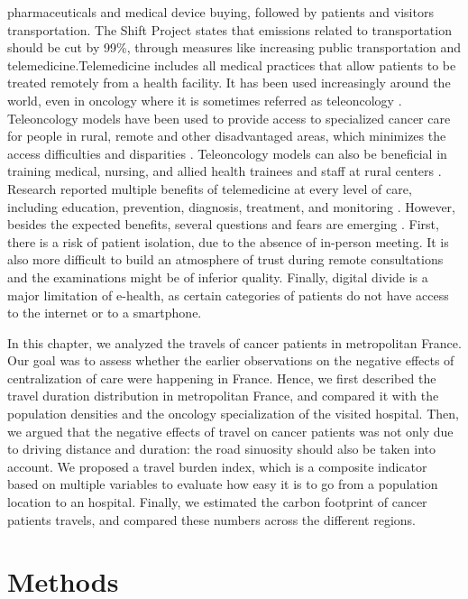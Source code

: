 pharmaceuticals and medical device buying, followed by patients and visitors
transportation. The Shift Project states that emissions related to
transportation should be cut by 99\%, through measures like increasing public
transportation and telemedicine.Telemedicine includes all medical practices that
allow patients to be treated remotely from a health facility. It has been used
increasingly around the world, even in oncology where it is sometimes referred
as teleoncology
\cite{mooi_teleoncology_2012,sabesan_are_2014,sabesan_timely_2014,sabesan_medical_2014}.
Teleoncology models have been used to provide access to specialized cancer care
for people in rural, remote and other disadvantaged areas, which minimizes the
access difficulties and disparities \cite{sabesan_telemedicine_2012,
    sabesan_are_2014}. Teleoncology models can also be beneficial in training
medical, nursing, and allied health trainees and staff at rural centers
\cite{sabesan_medical_2014}. Research reported multiple benefits of telemedicine
at every level of care, including education, prevention, diagnosis, treatment,
and monitoring \cite{bertucci_outpatient_2019}. However, besides the expected
benefits, several questions and fears are emerging
\cite{bertucci_outpatient_2019}. First, there is a risk of patient isolation,
due to the absence of in-person meeting. It is also more difficult to build an
atmosphere of trust during remote consultations and the examinations might be of
inferior quality. Finally, digital divide is a major limitation of e-health, as
certain categories of patients do not have access to the internet or to a
smartphone.

In this chapter, we analyzed the travels of cancer patients in metropolitan
France. Our goal was to assess whether the earlier observations on the negative
effects of centralization of care were happening in France. Hence, we first
described the travel duration distribution in metropolitan France, and compared
it with the population densities and the oncology specialization of the visited
hospital. Then, we argued that the negative effects of travel on cancer patients
was not only due to driving distance and duration: the road sinuosity should
also be taken into account. We proposed a travel burden index, which is a
composite indicator based on multiple variables to evaluate how easy it is to go
from a population location to an hospital. Finally, we estimated the carbon
footprint of cancer patients travels, and compared these numbers across the
different regions.

\section{Methods}

